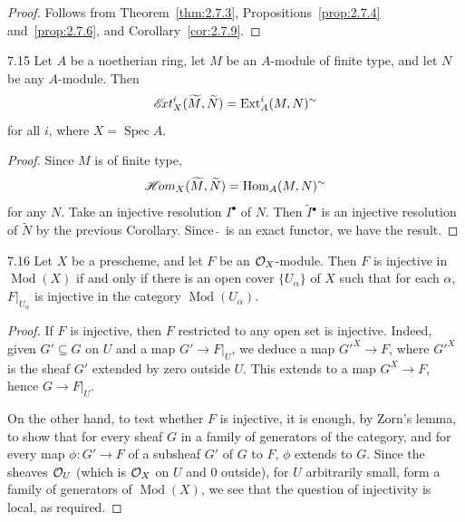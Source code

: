 \begin{proof}
Follows from Theorem~\ref{thm:2.7.3}, Propositions~\ref{prop:2.7.4} and~\ref{prop:2.7.6}, and Corollary~\ref{cor:2.7.9}.
\end{proof}

\begin{bookcorollary}{7.15}\label{cor:2.7.15}
Let $A$ be a noetherian ring, let $M$ be an $A$-module of finite type, and let $N$ be any $A$-module. Then
\[
\mathop{\mathscr{E}\!xt}\nolimits_X^i(\widetilde{M},\widetilde{N}) = \operatorname{Ext}_A^i(M,N)^{\sim}
\]
for all $i$, where $X=\operatorname{Spec}A$.
\end{bookcorollary}

\begin{proof}
Since $M$ is of finite type,
\[
\mathop{\mathscr{H}\!om}\nolimits_X(\widetilde{M},\widetilde{N}) = \operatorname{Hom}_A(M,N)^{\sim}
\]
for any $N$. Take an injective resolution $I^\bullet$ of $N$. Then $\widetilde{I}{}^\bullet$ is an injective resolution of $\widetilde{N}$ by the previous Corollary. Since $\widetilde{\;}$ is an exact functor, we have the result.
\end{proof}

\begin{booklemma}{7.16}\label{lem:2.7.16}
Let $X$ be a prescheme, and let $F$ be an $\mathcal{O}_X$-module. Then $F$ is injective in $\operatorname{Mod}(X)$ if and only if there is an open cover $\{U_\alpha\}$ of $X$ such that for each $\alpha$, $F|_{U_\alpha}$ is injective in the category $\operatorname{Mod}(U_\alpha)$.
\end{booklemma}

\begin{proof}
If $F$ is injective, then $F$ restricted to any open set is injective. Indeed, given $G'\subseteq G$ on $U$ and a map $G'\to F|_U$, we deduce a map $G'^X\to F$, where $G'^X$ is the sheaf $G'$ extended by zero outside $U$. This extends to a map $G^X\to F$, hence $G\to F|_U$.

On the other hand, to test whether $F$ is injective, it is enough, by Zorn's lemma, to show that for every sheaf $G$ in a family of generators of the category, and for every map $\phi\colon G'\to F$ of a subsheaf $G'$ of $G$ to $F$, $\phi$ extends to $G$. Since the sheaves $\mathcal{O}_U$ (which is $\mathcal{O}_X$ on $U$ and $0$ outside), for $U$ arbitrarily small, form a family of generators of $\operatorname{Mod}(X)$, we see that the question of injectivity is local, as required.
\end{proof}

